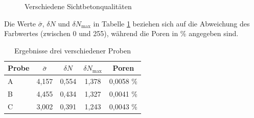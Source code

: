 \documentclass{article}
\begin{document}
\begin{figure}[htbp]
	\centering
	\caption{Verschiedene Sichtbetonqualitäten}
\end{figure}

Die Werte $\bar{\sigma}$, $\delta N$ und $\delta N_\text{max}$ in Tabelle \ref{tab:ergebnisse} beziehen sich auf die Abweichung des Farbwertes (zwischen 0 und 255), während die Poren in \% angegeben sind.

\begin{table}[ht]
	\centering
	\caption{Ergebnisse drei verschiedener Proben}
	\begin{tabular}{lcccc}
		\toprule
		Probe & $\bar{\sigma}$ & $\delta N$ & $\delta N_\text{max}$ & Poren\\
		\midrule
		A & 4,157 & 0,554 & 1,378 & 0,0058 \% \\
		B & 4,455 & 0,434 & 1,327 & 0,0041 \% \\
		C & 3,002 & 0,391 & 1,243 & 0,0043 \% \\
		\bottomrule
	\end{tabular}
	\label{tab:ergebnisse}
\end{table}
\end{document}
